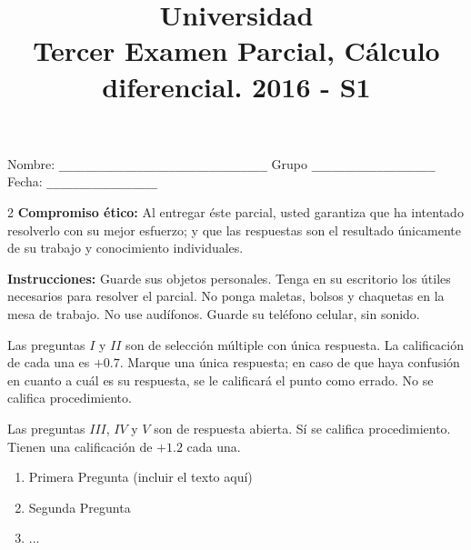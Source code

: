 \documentclass[letterpaper]{article} %
\title{Universidad  \\Tercer Examen Parcial, Cálculo diferencial.  2016 - S1}
\begin{document}
\date{}
\maketitle

Nombre: \verb+________________________________+ Grupo \verb+___________________+ Fecha: \verb+_________________+ \\

\begin{multicols}{2}
  \textbf{Compromiso ético:} Al entregar éste parcial, usted garantiza
  que ha intentado resolverlo con su mejor esfuerzo; y que las
  respuestas son el resultado únicamente de su trabajo y conocimiento
  individuales.

  \textbf{Instrucciones:} Guarde sus objetos personales. Tenga en su
  escritorio los útiles necesarios para resolver el parcial. No ponga
  maletas, bolsos y chaquetas en la mesa de trabajo. No use
  audífonos. Guarde su teléfono celular, sin sonido.

  Las preguntas $I$ y $II$ son de selección múltiple con
  única respuesta.
La calificación de cada una es $+0.7$.
Marque una
  única respuesta; en caso de que haya confusión en cuanto a cuál es
  su respuesta, se le calificará el punto como errado. No se califica
  procedimiento.

Las preguntas $III$, $IV$ y $V$ son de respuesta abierta. Sí se califica procedimiento. Tienen una calificación de $+1.2$ cada una.



\hspace{1cm}
    \begin{enumerate}[I]
\item Primera Pregunta (incluir el texto aquí)
\item Segunda Pregunta
\item ...
\end{enumerate}
\end{multicols}
\end{document}
